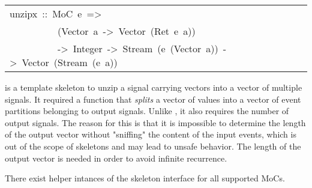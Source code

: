 \begin{haddockdesc}
\item[\begin{tabular}{@{}l}
unzipx\ ::\ MoC\ e\ =>\\\ \ \ \ \ \ \ \ \ \ (Vector\ a\ ->\ Vector\ (Ret\ e\ a))\\\ \ \ \ \ \ \ \ \ \ ->\ Integer\ ->\ Stream\ (e\ (Vector\ a))\ ->\ Vector\ (Stream\ (e\ a))
\end{tabular}]\haddockbegindoc
{} is a template skeleton to unzip a signal carrying
 vectors into a vector of multiple signals. It required a function
 that \emph{splits} a vector of values into a vector of event partitions
 belonging to output signals. Unlike , it also requires the
 number of output signals. The reason for this is that it is
 impossible to determine the length of the output vector without
 "sniffing" the content of the input events, which is out of the
 scope of skeletons and may lead to unsafe behavior. The length of
 the output vector is needed in order to avoid infinite recurrence.\par
There exist helper intances of the  skeleton interface for
 all supported MoCs.\par
{}\par

\end{haddockdesc}